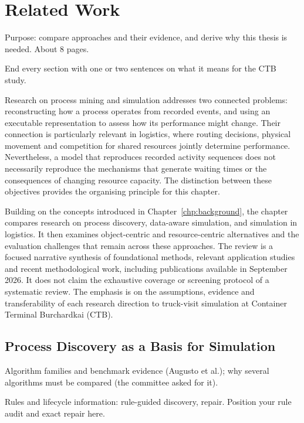 \chapter{Related Work}
\label{chp:related_work}
\begin{hints}
\item Purpose: compare approaches and their evidence, and derive why this thesis is needed. About 8 pages.
\item End every section with one or two sentences on what it means for the CTB study.
\end{hints}

Research on process mining and simulation addresses two connected problems: reconstructing how a process operates from recorded events, and using an executable representation to assess how its performance might change. Their connection is particularly relevant in logistics, where routing decisions, physical movement and competition for shared resources jointly determine performance. Nevertheless, a model that reproduces recorded activity sequences does not necessarily reproduce the mechanisms that generate waiting times or the consequences of changing resource capacity. The distinction between these objectives provides the organising principle for this chapter.

Building on the concepts introduced in Chapter~\ref{chp:background}, the chapter compares research on process discovery, data-aware simulation, and simulation in logistics. It then examines object-centric and resource-centric alternatives and the evaluation challenges that remain across these approaches. The review is a focused narrative synthesis of foundational methods, relevant application studies and recent methodological work, including publications available in September 2026. It does not claim the exhaustive coverage or screening protocol of a systematic review. The emphasis is on the assumptions, evidence and transferability of each research direction to truck-visit simulation at Container Terminal Burchardkai (CTB).

\section{Process Discovery as a Basis for Simulation}
\label{sec:rw_discovery}
\begin{hints}
\item Algorithm families and benchmark evidence (Augusto et al.); why several algorithms must be compared (the committee asked for it).
\item Rules and lifecycle information: rule-guided discovery, repair. Position your rule audit and exact repair here.
\end{hints}

